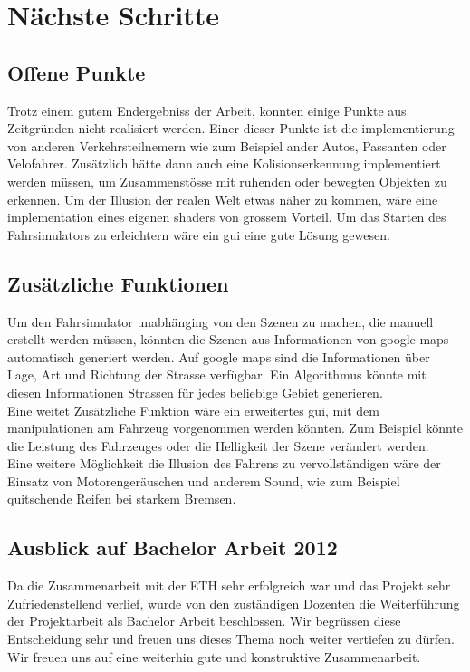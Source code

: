 \section{Nächste Schritte}
\subsection{Offene Punkte}
Trotz einem gutem Endergebniss der Arbeit, konnten einige Punkte aus Zeitgründen nicht realisiert werden. Einer dieser Punkte ist die implementierung von anderen Verkehrsteilnemern wie zum Beispiel ander Autos, Passanten oder Velofahrer. Zusätzlich hätte dann auch eine Kolisionserkennung implementiert werden müssen, um Zusammenstösse mit ruhenden oder bewegten Objekten zu erkennen. Um der Illusion der realen Welt etwas näher zu kommen, wäre eine implementation eines eigenen \glspl{shader} von grossem Vorteil. Um das Starten des Fahrsimulators zu erleichtern wäre ein \gls{gui} eine gute Lösung gewesen. 
\subsection{Zusätzliche Funktionen}
Um den Fahrsimulator unabhänging von den Szenen zu machen, die manuell erstellt werden müssen, könnten die Szenen aus Informationen von google maps automatisch generiert werden. Auf google maps sind die Informationen über Lage, Art und Richtung der Strasse verfügbar. Ein Algorithmus könnte mit diesen Informationen Strassen für jedes beliebige Gebiet generieren. \\
Eine weitet Zusätzliche Funktion wäre ein erweitertes \gls{gui}, mit dem manipulationen am Fahrzeug vorgenommen werden könnten. Zum Beispiel könnte die Leistung des Fahrzeuges oder die Helligkeit der Szene verändert werden.\\
Eine weitere Möglichkeit die Illusion des Fahrens zu vervollständigen wäre der Einsatz von Motorengeräuschen und anderem Sound, wie zum Beispiel quitschende Reifen bei starkem Bremsen. 
\subsection{Ausblick auf Bachelor Arbeit 2012}
Da die Zusammenarbeit mit der ETH sehr erfolgreich war und das Projekt sehr Zufriedenstellend verlief, wurde von den zuständigen Dozenten die Weiterführung der Projektarbeit als Bachelor Arbeit beschlossen. Wir begrüssen diese Entscheidung sehr und freuen uns dieses Thema noch weiter vertiefen zu dürfen. Wir freuen uns auf eine weiterhin gute und konstruktive Zusammenarbeit. 